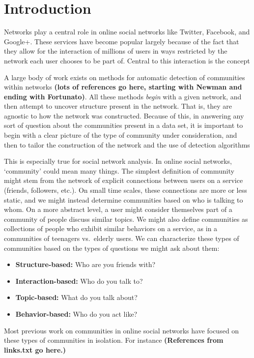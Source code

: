 \documentclass[letterpaper]{article}
\begin{document}
\section{Introduction}

Networks play a central role in online social networks like Twitter, Facebook, and Google+. These services have become popular largely because of the fact that they allow for the interaction of millions of users in ways restricted by the network each user chooses to be part of. Central to this interaction is the concept 

A large body of work exists on methods for automatic detection of communities within networks \textbf{(lots of references go here, starting with Newman and ending with Fortunato)}. All these methods \emph{begin} with a given network, and then attempt to uncover structure present in the network. That is, they are agnostic to how the network was constructed. Because of this, in answering any sort of question about the communities present in a data set, it is important to begin with a clear picture of the type of community under consideration, and then to tailor the construction of the network and the use of detection algorithms 

This is especially true for social network analysis. In online social networks, `community' could mean many things. The simplest definition of community might stem from the network of explicit connections between users on a service (friends, followers, etc.). On small time scales, these connections are more or less static, and we might instead determine communities based on who is talking to whom. On a more abstract level, a user might consider themselves part of a community of people discuss similar topics. We might also define communities as collections of people who exhibit similar behaviors on a service, as in a communities of teenagers vs.\ elderly users. We can characterize these types of communities based on the types of questions we might ask about them:
\begin{itemize}
	\item \textbf{Structure-based:} Who are you friends with?
	\item \textbf{Interaction-based:} Who do you talk to?
	\item \textbf{Topic-based:} What do you talk about?
	\item \textbf{Behavior-based:}  Who do you act like?
\end{itemize}

Most previous work on communities in online social networks have focused on these types of communities in isolation. For instance \textbf{(References from links.txt go here.)}
\end{document}
